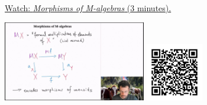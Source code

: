 
\begin{minipage}{10cm}
    \href{https://act4e-spring21.netlify.app/videos/spring2021-monads-b:morph-algebras.html}{Watch: \emph{Morphisms of M-algebras} (3 minutes).}
        
    \href{https://act4e-spring21.netlify.app/videos/spring2021-monads-b:morph-algebras.html}{\includegraphics[height=3.5cm]{spring2021-monads-b:morph-algebras/thumbnails.jpg}}
    \href{https://act4e-spring21.netlify.app/videos/spring2021-monads-b:morph-algebras.html}{\includegraphics[height=2.5cm]{spring2021-monads-b:morph-algebras/qrcode.png}}
\end{minipage}
